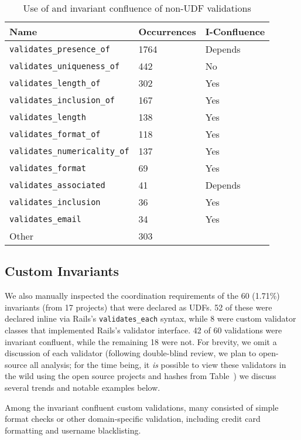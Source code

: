 \begin{table}
\begin{tabular}{|l l l |}
\hline
Name & Occurrences & I-Confluence\\\hline
\texttt{validates\_presence\_of} & 1764 & Depends\\
\texttt{validates\_uniqueness\_of} & 442 & No \\
\texttt{validates\_length\_of} & 302 & Yes \\
\texttt{validates\_inclusion\_of} & 167 & Yes\\
\texttt{validates\_length} & 138 & Yes \\
\texttt{validates\_format\_of} & 118 & Yes\\
\texttt{validates\_numericality\_of} & 137 & Yes \\
\texttt{validates\_format} & 69 & Yes \\
\texttt{validates\_associated} & 41 & Depends\\
\texttt{validates\_inclusion} & 36 & Yes \\
\texttt{validates\_email} & 34 & Yes \\
Other & 303 & \\\hline
\end{tabular}
\caption{Use of and invariant confluence of non-UDF validations}
\label{table:builtins}
\end{table}

\subsection{Custom Invariants}

We also manually inspected the coordination requirements of the 60
(1.71\%) invariants (from 17 projects) that were declared as UDFs. 52
of these were declared inline via Rails's \texttt{validates\_each}
syntax, while 8 were custom validator classes that implemented Rails's
validator interface. 42 of 60 validations were invariant confluent,
while the remaining 18 were not. For brevity, we omit a discussion of
each validator (following double-blind review, we plan to open-source
all analysis; for the time being, it \textit{is} possible to view
these validators in the wild using the open source projects and hashes
from Table~\cite{table:app-summary}) we discuss several trends and
notable examples below.

Among the invariant confluent custom validations, many consisted of
simple format checks or other domain-specific validation, including
credit card formatting and username blacklisting.


